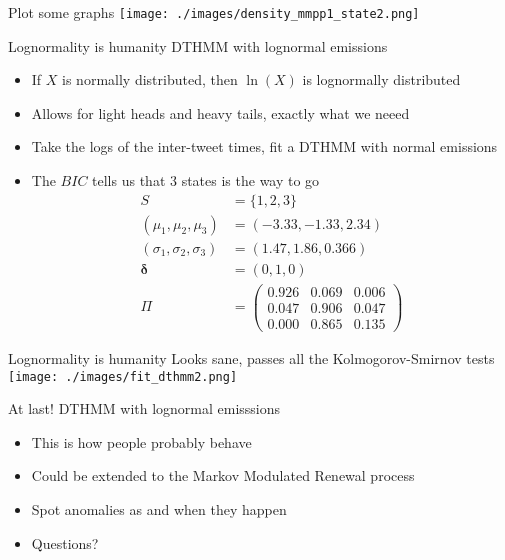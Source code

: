 \documentclass{beamer}
\begin{document}
\begin{frame}{Plot some graphs}
\centering
\texttt{[image: ./images/density\_mmpp1\_state2.png]}
\end{frame}

\begin{frame}{Lognormality is humanity}
DTHMM with lognormal emissions
\begin{itemize}
\pause \item If $X$ is normally distributed, then $\ln (X)$ is lognormally distributed
\pause \item Allows for light heads and heavy tails, exactly what we neeed
\pause \item Take the logs of the inter-tweet times, fit a DTHMM with normal emissions
\pause \item The $BIC$ tells us that 3 states is the way to go
\pause
\begin{align*}
S &= \{1,2,3\}\\
(\mu_1, \mu_2, \mu_3) &= (-3.33, -1.33, 2.34)\\
(\sigma_1, \sigma_2, \sigma_3) &= (1.47, 1.86, 0.366)\\
\bm{\delta} &= (0,1,0)\\
\Pi &= 
\left(
	\begin{matrix}
     0.926 & 0.069 & 0.006 \\
     0.047 & 0.906 & 0.047 \\
     0.000 & 0.865 & 0.135
	\end{matrix}
\right)
\end{align*}
\end{itemize}
\end{frame}

\begin{frame}{Lognormality is humanity}
Looks sane, passes all the Kolmogorov-Smirnov tests
\texttt{[image: ./images/fit\_dthmm2.png]}
\end{frame}

\begin{frame}{At last!}
DTHMM with lognormal emisssions
\begin{itemize}
\pause \item This is how people probably behave
\pause \item Could be extended to the Markov Modulated Renewal process
\pause \item Spot anomalies as and when they happen
\pause \item Questions?
\end{itemize}
\end{frame}
\end{document}
